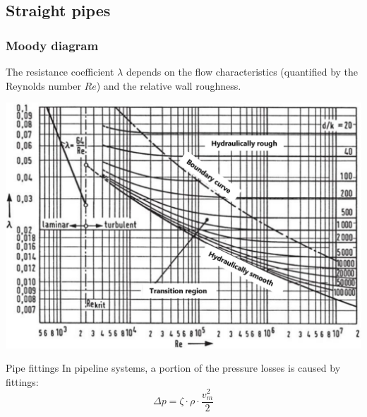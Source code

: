 \documentclass{article}
\begin{document}
\begin{multicols}{2}
\vfill
\columnbreak

\subsection{Straight pipes}
\subsubsection{Moody diagram}
The resistance coefficient $\lambda$ depends on the flow characteristics
(quantified by the Reynolds number $Re$) and the relative wall roughness.

\includegraphics[width=\columnwidth]{media/Moody-Diagramm_en.png}

\begin{theorybox}{Pipe fittings}
    In pipeline systems, a portion of the pressure losses is caused by fittings:
    \begin{equation}
        \Delta p = \zeta \cdot \rho \cdot \frac{v_m^2}{2}
    \end{equation}


\end{theorybox}
\end{multicols}
\end{document}
